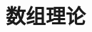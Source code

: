 \documentclass[UTF8]{ctexart}
\begin{document}
\setlength{\abovedisplayskip}{1pt}
\setlength{\belowdisplayskip}{1pt}

\section{数组理论}
\end{document}
